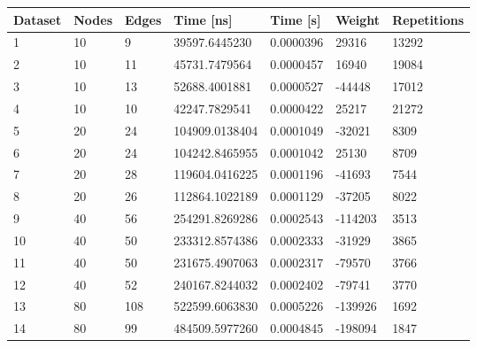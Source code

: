 \begin{longtable}{lllllll}
    \textbf{Dataset} & \textbf{Nodes} & \textbf{Edges} & \textbf{Time [ns]}  & \textbf{Time [s]} & \textbf{Weight} & \textbf{Repetitions} \\
    \endhead
    1                & 10             & 9              & 39597.6445230      & 0.0000396        & 29316           & 13292                \\
    2                & 10             & 11             & 45731.7479564      & 0.0000457        & 16940           & 19084                \\
    3                & 10             & 13             & 52688.4001881      & 0.0000527        & -44448          & 17012                \\
    4                & 10             & 10             & 42247.7829541      & 0.0000422        & 25217           & 21272                \\
    5                & 20             & 24             & 104909.0138404     & 0.0001049        & -32021          & 8309                 \\
    6                & 20             & 24             & 104242.8465955     & 0.0001042        & 25130           & 8709                 \\
    7                & 20             & 28             & 119604.0416225     & 0.0001196        & -41693          & 7544                 \\
    8                & 20             & 26             & 112864.1022189     & 0.0001129        & -37205          & 8022                 \\
    9                & 40             & 56             & 254291.8269286     & 0.0002543        & -114203         & 3513                 \\
    10               & 40             & 50             & 233312.8574386     & 0.0002333        & -31929          & 3865                 \\
    11               & 40             & 50             & 231675.4907063     & 0.0002317        & -79570          & 3766                 \\
    12               & 40             & 52             & 240167.8244032     & 0.0002402        & -79741          & 3770                 \\
    13               & 80             & 108            & 522599.6063830     & 0.0005226        & -139926         & 1692                 \\
    14               & 80             & 99             & 484509.5977260     & 0.0004845        & -198094         & 1847                 \\

\end{longtable}
